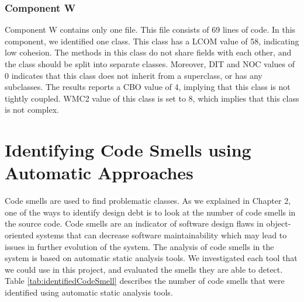  





\subsubsection{Component W}
Component W contains only one file. This file consists of 69 lines of code. In this component, we identified one class. This class has a LCOM value of 58, indicating low cohesion. The methods in this class do not share fields with each other, and the class should be split into separate classes. Moreover, DIT and NOC values of 0 indicates that this class does not inherit from a superclass, or has any subclasses. The results reports a CBO value of 4, implying that this class is not tightly coupled. WMC2 value of this class is set to 8, which implies that this class is not complex.































\section{Identifying Code Smells using Automatic Approaches}
\label{sub:code_smell_detection}
Code smells are used to find problematic classes.
As we explained in Chapter 2, one of the ways to identify design debt is to look at the number of code smells in the source code. Code smells are an indicator of software design flaws in object-oriented systems that can decrease software maintainability which may lead to issues in further evolution of the system\cite{olbrich2009evolution}. The analysis of code smells in the system is based on automatic static analysis tools. We investigated each tool that we could use in this project, and evaluated the smells they are able to detect. Table \ref{tab:identifiedCodeSmell} describes the number of code smells that were identified using automatic static analysis tools.

